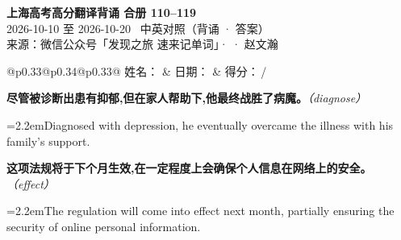 \documentclass[11pt,a4paper]{article}
\newcommand{\num}[1]{\makebox[1.9em][r]{#1.}\hspace{0.3em}}
\newcommand{\prompt}[1]{\emph{\textcolor{tipblue}{\small（#1）}}}
\begin{document}
\pagestyle{plain}
\begin{center}
{\LARGE\bfseries 上海高考高分翻译背诵 \quad 合册 110–119}\\[0.25em]
{\large 2026-10-10 至 2026-10-20 \quad\ 中英对照（背诵 · 答案）}\\[0.35em]
{\footnotesize 来源：微信公众号「发现之旅 速来记单词」·  · 赵文瀚}
\end{center}

\vspace{0.4em}
\noindent\begin{tabular}{@{}p{0.33\textwidth}@{}p{0.34\textwidth}@{}p{0.33\textwidth}@{}}
姓名：\underline{\hspace{2.0cm}} & 日期：\underline{\hspace{2.0cm}} & 得分：\underline{\hspace{1.4cm}}\,/ \\
\end{tabular}

\vspace{0.5em}

\vspace{0.8em}
\vspace{0.35em}\vspace{0.15em}

\begin{minipage}{\linewidth}

\num{1}\textbf{尽管被诊断出患有抑郁,但在家人帮助下,他最终战胜了病魔。}\prompt{diagnose}

\vspace{0.15em}

\noindent\hangindent=2.2em\hspace{2.2em}Diagnosed with depression, he eventually overcame the illness with his family’s support.

\end{minipage}

\begin{minipage}{\linewidth}

\num{2}\textbf{这项法规将于下个月生效,在一定程度上会确保个人信息在网络上的安全。}\prompt{effect}

\vspace{0.15em}

\noindent\hangindent=2.2em\hspace{2.2em}The regulation will come into effect next month, partially ensuring the security of online personal information.

\end{minipage}
\end{document}
